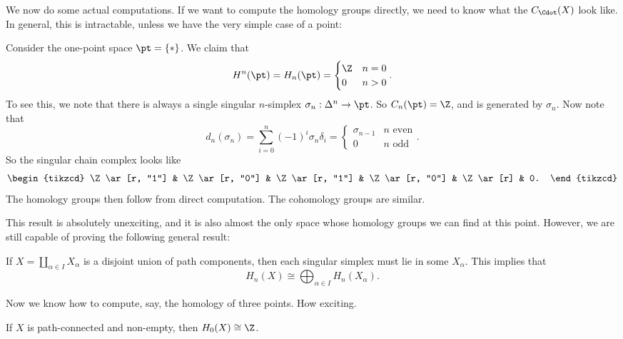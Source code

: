 \documentclass[a4paper]{article}
\theoremstyle{definition}
\begin{document}
We now do some actual computations. If we want to compute the homology groups directly, we need to know what the $C_\Cdot(X)$ look like. In general, this is intractable, unless we have the very simple case of a point:
\begin{eg}
  Consider the one-point space $\pt = \{*\}$. We claim that
  \[
    H^n(\pt) = H_n(\pt) =
    \begin{cases}
      \Z & n = 0\\
      0 & n > 0
    \end{cases}.
  \]
  To see this, we note that there is always a single singular $n$-simplex $\sigma_n: \Delta^n \to \pt$. So $C_n(\pt) = \Z$, and is generated by $\sigma_n$. Now note that
  \[
    d_n(\sigma_n) = \sum_{i = 0}^n (-1)^i \sigma_n \delta_i =
    \begin{cases}
      \sigma_{n - 1} & n\text{ even}\\
      0 & n\text{ odd}
    \end{cases}.
  \]
  So the singular chain complex looks like
  \[
    \begin{tikzcd}
      \Z \ar[r, "1"] & \Z\ar[r, "0"] & \Z \ar[r, "1"] & \Z \ar[r, "0"] & \Z \ar[r] & 0.
    \end{tikzcd}
  \]
  The homology groups then follow from direct computation. The cohomology groups are similar.
\end{eg}
This result is absolutely unexciting, and it is also almost the only space whose homology groups we can find at this point. However, we are still capable of proving the following general result:

\begin{eg}
  If $X = \coprod_{\alpha \in I} X_\alpha$ is a disjoint union of path components, then each singular simplex must lie in some $X_\alpha$. This implies that
  \[
    H_n(X) \cong \bigoplus_{\alpha \in I} H_n(X_\alpha).
  \]
\end{eg}
Now we know how to compute, say, the homology of three points. How exciting.

\begin{lemma}
  If $X$ is path-connected and non-empty, then $H_0(X) \cong \Z$.
\end{lemma}
\end{document}
